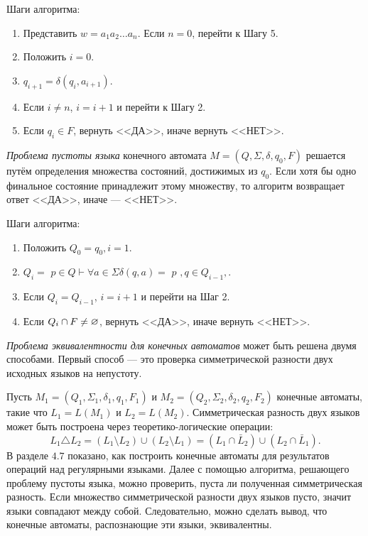 Шаги алгоритма:
\begin{enumerate}
\item  Представить $w = a_1a_2 \ldots a_n$. Если $n = 0$, перейти к Шагу 5.
\item Положить $i = 0$.
\item $q_{i+1} = \delta(q_i, a_{i+1})$.
\item Если $ i \neq n$, $ i = i + 1$ и перейти к Шагу 2.
\item Если $q_i \in F$, вернуть <<ДА>>, иначе вернуть <<НЕТ>>.
\end{enumerate}

\textit{Проблема пустоты языка} конечного автомата $M = (Q,\Sigma, \delta, q_0, F)$ решается путём определения множества состояний, достижимых из $q_0$. Если хотя бы одно финальное состояние принадлежит этому множеству, то алгоритм возвращает ответ <<ДА>>, иначе --- <<НЕТ>>.

Шаги алгоритма:
\begin{enumerate}
\item Положить $Q_0 = { q_0 }, i = 1$.
\item $Q_i = $ {$p \in Q \vdash \forall a \in \Sigma \delta(q, a) = $ {$ p $} $, q \in Q_{i-1},$}.
\item Если $Q_i = Q_{i-1}$, $i = i + 1$ и перейти на Шаг 2.
\item Если $Q_i \cap F \neq \varnothing$, вернуть <<ДА>>, иначе вернуть <<НЕТ>>.
\end{enumerate}

\textit{Проблема эквивалентности для конечных автоматов} может быть решена двумя способами. Первый способ --- это проверка симметрической разности двух исходных языков на непустоту.

Пусть $M_1 = (Q_1,\Sigma_1, \delta_1, q_1, F_1)$ и $M_2 = (Q_2,\Sigma_2, \delta_2, q_2, F_2)$ конечные автоматы, такие что $L_1 = L(M_1)$ и $L_2 = L(M_2)$. Симметрическая разность двух языков может быть построена через теоретико-логические операции:
\[ L_1 \triangle L_2 = (L_1 \setminus L_2) \cup(L_2 \setminus L_1) = (L_1 \cap \bar L_2) \cup (L_2 \cap \bar L_1). \]
В разделе $4.7$ показано, как построить конечные автоматы для результатов операций над регулярными языками. Далее с помощью алгоритма, решающего проблему пустоты языка, можно проверить, пуста ли полученная симметрическая разность. Если множество симметрической разности двух языков пусто, значит языки совпадают между собой. Следовательно, можно сделать вывод, что конечные автоматы, распознающие эти языки, эквивалентны.

